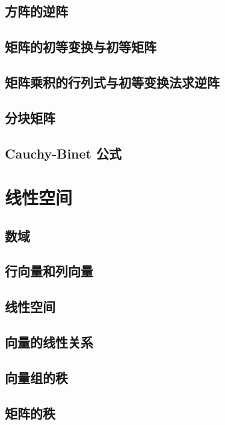 \documentclass[UTF8,12pt,a4paper,fontset=fandol]{ctexbook}
\begin{document}
\section{方阵的逆阵}

\section{矩阵的初等变换与初等矩阵}

\section{矩阵乘积的行列式与初等变换法求逆阵}

\section{分块矩阵}

\section{Cauchy-Binet 公式}


\chapter{线性空间}

\section{数域}

\section{行向量和列向量}

\section{线性空间}

\section{向量的线性关系}

\section{向量组的秩}

\section{矩阵的秩}
\end{document}
